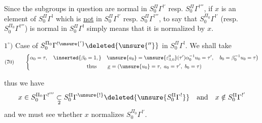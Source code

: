 Since the subgroups in question are normal in
$S_0^{\Pi}\Gamma^{!'}$ resp. $S_0^{\Pi}\Gamma^{!'''}$, 
if $x$ is an element of $S_0^{\Pi}\Gamma^{!}$ which is
\uline{not} in $S_0^{\Pi}\Gamma^{!'}$ resp. $S_0^{\Pi}\Gamma^{!'''}$,
to say that $S_0^{\Pi_0}\Gamma^{!'}$ (resp. $S_0^{\Pi_0}\Gamma^{!'''}$)
is normal in $S_0^{\Pi}\Gamma^{!}$  simply means
that it is normalized by $x$.

$1^\circ)$ Case of $S_0^{\Pi_0}\Gamma^{!\unsure{'}}\deleted{\unsure{''}}$
in $S_0^{\Pi}\Gamma^{!}$. We shall take
\[
(70)\qquad
\left\{
\begin{gathered}
\alpha_0=\tau,\quad \inserted{\beta_0=1,}\quad
\unsure{a_0}=\unsure{\varepsilon^0_{3,0}}(\tau')\alpha_0^{-1}u_0=\tau',
\quad b_0=\beta_0^{-1}u_0=\tau\big)\\
\text{thus}\qquad
\underline{x}=(\unsure{u_0}=\tau,\ a_0=\tau',\ b_0=\tau)
\end{gathered}
\right.
\]



thus we have
\[
x\in S_0^{\Pi_0}\Gamma^{!'''}
\underset{2}{\subset}S_0^{\Pi}\Gamma^{\unsure{!}}
\deleted{\unsure{S_0^{\Pi}\Gamma^{!}}}
\quad\text{and}\quad x\notin S_0^{\Pi}\Gamma^{!'}
\]
and we must see whether $x$ normalizes $S_0^{\Pi_0}\Gamma^{!'}$.

